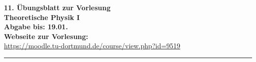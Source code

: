 \newenvironment{exercise}
[2]
{\addtocounter{exercise}{1}{\bfseries{Aufgabe \arabic{exercise}:~#1}\hfill(#2 Punkte)}\newline}
{\medskip}

\setlength{\parindent}{0mm}

{\large\bfseries 11. Übungsblatt zur Vorlesung\hfill\thesemester}\\ %
{\large\bfseries Theoretische Physik I\hfill\theprofessor}\\
{\large\bfseries Abgabe bis: 19.01.}\\
\textbf{Webseite zur Vorlesung: \\}
\url{https://moodle.tu-dortmund.de/course/view.php?id=9519} \\
\rule{\columnwidth}{0.1ex}
\medskip
